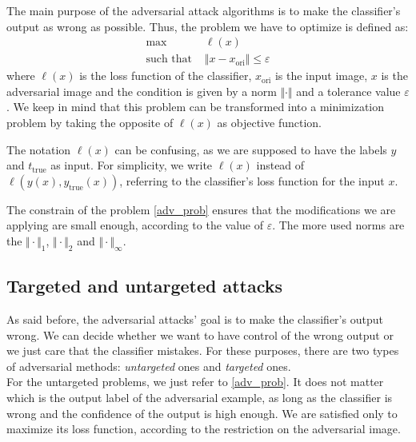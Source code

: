 \documentclass[10pt,twocolumn,letterpaper, english]{article}
\theoremstyle{definition}
\theoremstyle{plain}
\theoremstyle{plain}
\theoremstyle{plain}
\theoremstyle{plain}
\theoremstyle{remark}
\theoremstyle{remark}
\theoremstyle{definition}
\theoremstyle{definition}
\theoremstyle{definition}
\theoremstyle{definition}
\renewcommand{\epsilon}{\varepsilon}
\begin{document}
The main purpose of the adversarial attack algorithms is to make the classifier's output as wrong as possible. 
Thus, the problem we have to optimize is defined as: 
\begin{align}
    \max \, &\ell(x) \label{adv_prob} \\
    \text{such that } & \Vert x - x_{\text{ori}} \Vert \le \epsilon \nonumber
\end{align}
where $\ell(x)$ is the loss function of the classifier, $x_{\text{ori}}$ is the input image, $x$ is the adversarial image and the condition is given by a norm $\Vert \cdot \Vert$ and a tolerance value $\epsilon$. 
We keep in mind that this problem can be transformed into a minimization problem by taking the opposite of $\ell(x)$ as objective function. 

The notation $\ell(x)$ can be confusing, as we are supposed to have the labels $y$ and $t_{\text{true}}$ as input. 
For simplicity, we write $\ell(x)$ instead of $\ell(y(x), y_{\text{true}}(x))$, referring to the classifier's loss function for the input $x$. 

The constrain of the problem \ref{adv_prob} ensures that the modifications we are applying are small enough, according to the value of $\epsilon$. 
The more used norms are the $\Vert \cdot \Vert_1$, $\Vert \cdot \Vert_2$ and $\Vert \cdot \Vert_{\infty}$. 

\subsection{Targeted and untargeted attacks} 

As said before, the adversarial attacks' goal is to make the classifier's output wrong. 
We can decide whether we want to have control of the wrong output or we just care that the classifier mistakes. 
For these purposes, there are two types of adversarial methods: \textit{untargeted} ones and \textit{targeted} ones. \\ 

For the untargeted problems, we just refer to \ref{adv_prob}. 
It does not matter which is the output label of the adversarial example, as long as the classifier is wrong and the confidence of the output is high enough. 
We are satisfied only to maximize its loss function, according to the restriction on the adversarial image.\\
\end{document}
